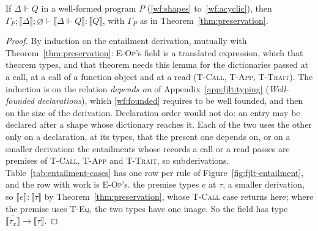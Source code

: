 \begin{lemma}
\label{lem:dict}
If $\Delta \Vdash Q$ in a well-formed program $P$ (\ref{wf:shapes} to~\ref{wf:acyclic}), then $\Gamma_P; \llbracket \Delta \rrbracket; \varnothing \vdash \llbracket \Delta \Vdash Q \rrbracket : \llbracket Q \rrbracket$, with $\Gamma_P$ as in Theorem~\ref{thm:preservation}.
\end{lemma}
\begin{proof}
By induction on the entailment derivation, mutually with Theorem~\ref{thm:preservation}: \textsc{E-Op}'s field is a translated expression, which that theorem types, and that theorem needs this lemma for the dictionaries passed at a call, at a call of a function object and at a read (\textsc{T-Call}, \textsc{T-App}, \textsc{T-Trait}).
The induction is on the relation \emph{depends on} of Appendix~\ref{app:fjlt:typing} (\emph{Well-founded declarations}), which \ref{wf:founded} requires to be well founded, and then on the size of the derivation.
Declaration order would not do: an entry may be declared after a shape whose dictionary reaches it.
Each of the two uses the other only on a declaration, at its types, that the present one depends on, or on a smaller derivation: the entailments whose records a call or a read passes are premises of \textsc{T-Call}, \textsc{T-App} and \textsc{T-Trait}, so subderivations.
Table~\ref{tab:entailment-cases} has one row per rule of Figure~\ref{fig:fjlt-entailment}, and the row with work is \textsc{E-Op}'s.
the premise types $e$ at $\tau$, a smaller derivation, so $\llbracket e \rrbracket : \llbracket \tau \rrbracket$ by Theorem~\ref{thm:preservation}, whose \textsc{T-Call} case returns here; where the premise uses \textsc{T-Eq}, the two types have one image.
So the field has type $\overline{\llbracket \tau_x \rrbracket} \to \llbracket \tau \rrbracket$.
\end{proof}

